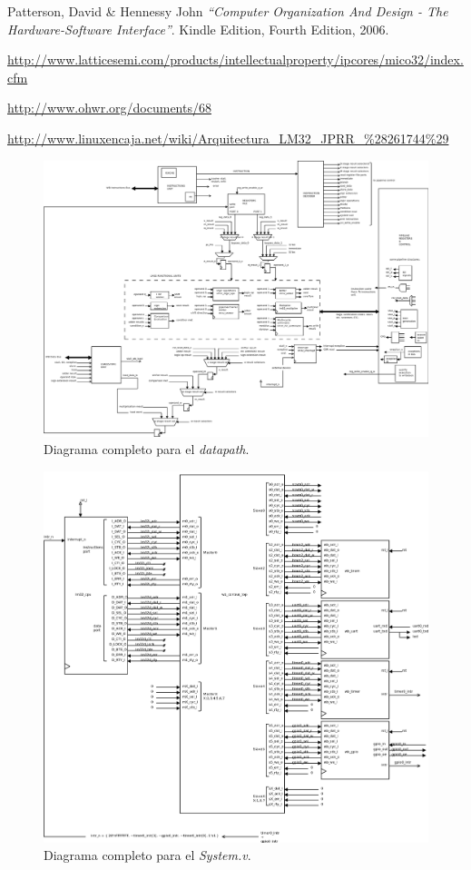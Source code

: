 \documentclass[twocolumn]{IEEEtran}
\begin{document}

\begin{thebibliography}{99}
 Patterson, David \& Hennessy John
{\em "`Computer Organization And Design - The Hardware-Software Interface"'}.
Kindle Edition, Fourth Edition, 2006.

 \url{http://www.latticesemi.com/products/intellectualproperty/ipcores/mico32/index.cfm}

 \url{http://www.ohwr.org/documents/68}

 \url{http://www.linuxencaja.net/wiki/Arquitectura_LM32_JPRR_%28261744%29}
\end{thebibliography}
\begin{landscape}
\begin{figure}[H]
	\centering
		\includegraphics[scale=0.32]{DATAPATH.png}
	\caption{Diagrama completo para el \textit{datapath}.}
	\label{fig2}
\end{figure}
\end{landscape}
\begin{landscape}
\begin{figure}[H]
	\centering
		\includegraphics[scale=0.34]{system_v2.png}
	\caption{Diagrama completo para el \textit{System.v}.}
	\label{fig3}
\end{figure}
\end{landscape}
\end{document}
